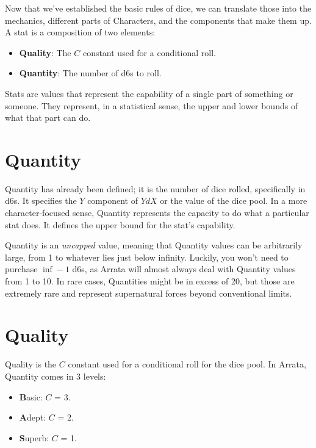 \documentclass[../main.tex]{subfiles}
\begin{document}
    Now that we've established the basic rules of dice, we can translate those into the mechanics, different parts of Characters, and the components that make them up. A stat is a composition of two elements:

    \begin{itemize}
        \item \textbf{Quality}: The $C$ constant used for a conditional roll.
        \item \textbf{Quantity}: The number of d6s to roll.
    \end{itemize}

    Stats are values that represent the capability of a single part of something or someone. They represent, in a statistical sense, the upper and lower bounds of what that part can do.

    \section{Quantity}

    Quantity has already been defined; it is the number of dice rolled, specifically in d6s. It specifies the $Y$ component of $YdX$ or the value of the dice pool. In a more character-focused sense, Quantity represents the capacity to do what a particular stat does. It defines the upper bound for the stat's capability.

    Quantity is an {\em uncapped} value, meaning that Quantity values can be arbitrarily large, from 1 to whatever lies just below infinity. Luckily, you won't need to purchase $\inf - 1$ d6s, as Arrata will almost always deal with Quantity values from 1 to 10. In rare cases, Quantities might be in excess of 20, but those are extremely rare and represent supernatural forces beyond conventional limits.

    \section{Quality}

    Quality is the $C$ constant used for a conditional roll for the dice pool. In Arrata, Quantity comes in 3 levels:
    
    \begin{itemize}
        \item \textbf{B}asic:  $C$ = 3.
        \item \textbf{A}dept:  $C$ = 2.
        \item \textbf{S}uperb: $C$ = 1.
    \end{itemize}
\end{document}
